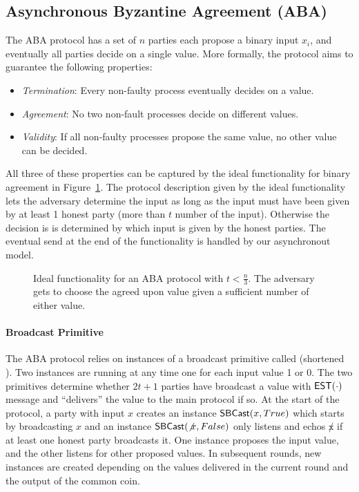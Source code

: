 \subsection{Asynchronous Byzantine Agreement (ABA)}
The ABA protocol has a set of $n$ parties each propose a binary input $x_i$,
and eventually all parties decide on a single value.  More formally, the
protocol aims to guarantee the following properties:
\begin{itemize}
\item \emph{Termination}: Every non-faulty process eventually decides on a
value.
\item \emph{Agreement}: No two non-fault processes decide on different values.
\item \emph{Validity}: If all non-faulty processes propose the same value, no
other value can be decided.
\end{itemize}
All three of these properties can be captured by the ideal functionality for
binary agreement in Figure~\ref{fig:faba}.  The protocol description given by
the ideal functionality lets the adversary determine the input as long as the
input must have been given by at least 1 honest party (more than $t$ number of
the input).  Otherwise the decision is is determined by which input is given by
the honest parties. The eventual send at the end of the functionality is handled
by our asynchronout model. 

\begin{figure}

\caption{Ideal functionality for an ABA protocol with $t < \frac{n}{3}$. The
adversary gets to choose the agreed upon value given a sufficient number of
either value.}
\label{fig:faba}
\end{figure}

\paragraph{Broadcast Primitive}
The ABA protocol relies on instances of a broadcast primitive called  (shortened ).
Two  instances are running at any time one for each input value 1 or 0.
The two primitives determine whether $2t+1$ parties have broadcast a value with ${\mathsf {EST}}(\cdot)$ message and ``delivers'' the value to the main protocol if so.
At the start of the protocol, a party with input $x$ creates an instance ${\mathsf {SBCast}}(x, True)$ which starts by broadcasting $x$ and an instance ${\mathsf {SBCast}}(\not x, False)$ only listens and echos $\not x$ if at least one honest party broadcasts it.
One instance proposes the input value, and the other listens for other proposed values.
In subsequent rounds,  new  instances are created depending on the values delivered in the current round and the output of the common coin.

